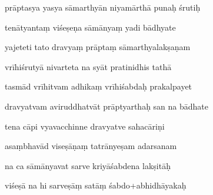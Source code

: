 \documentclass[article,12pt,a4paper]{memoir}%
\newcounter{parCount}
\begin{document}
	  
	  \pstart {} prāptasya yasya sāmarthyān niyamārthā punaḥ śrutiḥ 
	{}
	\pend%
      

	  
	  \pstart \leavevmode%
	tenātyantaṃ viśeṣeṇa sāmānyaṃ yadi bādhyate 
	{}
	\pend%
      

	  
	  \pstart {} yajeteti tato dravyaṃ prāptaṃ sāmarthyalakṣaṇam 
	{}
	\pend%
      

	  
	  \pstart \leavevmode%
	vrīhiśrutyā nivarteta na syāt pratinidhis tathā 
	{}
	\pend%
      

	  
	  \pstart {} tasmād vrīhitvam adhikaṃ vrīhiśabdaḥ prakalpayet 
	{}
	\pend%
      

	  
	  \pstart \leavevmode%
	dravyatvam aviruddhatvāt prāptyarthaḥ san na bādhate 
	{}
	\pend%
      

	  
	  \pstart {} tena cāpi vyavacchinne dravyatve sahacāriṇi 
	{}
	\pend%
      

	  
	  \pstart \leavevmode%
	asaṃbhavād viseṣāṇaṃ tatrānyeṣam adarsanam 
	{}
	\pend%
      

	  
	  \pstart {} na ca sāmānyavat sarve kriyāśabdena lakṣitāḥ 
	{}
	\pend%
      

	  
	  \pstart \leavevmode%
	viśeṣā na hi sarveṣāṃ satāṃ śabdo+abhidhāyakaḥ 
	{}
	\pend%
      
\end{document}
